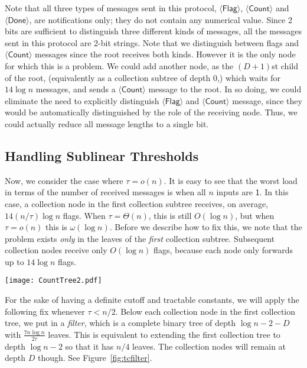 \documentclass[11pt,letter]{article}
\theoremstyle{mytheoremstyle}
\let\savedCaption=\caption
\renewcommand*{\caption}[1]{\savedCaption[#1]{~#1}}
\newcommand{\dcl}{D}
\newcommand{\flag}{$\langle\mathsf{Flag}\rangle$\xspace}
\newcommand{\countm}{$\langle\mathsf{Count}\rangle$\xspace}
\newcommand{\done}{$\langle\mathsf{Done}\rangle$\xspace}
\newcommand{\ct}{count tree\xspace}
\begin{document}
Note that all three types of messages sent in this protocol, \flag, \countm and \done, are notifications only; they do not contain any numerical value.
Since 2 bits are sufficient to distinguish three different kinds of messages, all the messages sent in this protocol are 2-bit strings. Note that we distinguish between flags and \countm messages since the root receives both kinds. However it is the only node for which this is a problem. We could add another node, as the $(D+1)$st child of the root, (equivalently as a collection subtree of depth 0,) which waits for $14\log{n}$ messages, and sends a \countm message to the root. In so doing, we could eliminate the need to explicitly distinguish \flag and \countm message, since they would be automatically distinguished by the role of the receiving node. Thus, we could actually reduce all message lengths to a single bit.

\subsection{Handling Sublinear Thresholds}
Now, we consider the case where $\tau = o(n)$. It is easy to see that the worst load in terms of the number of received messages is when all $n$ inputs are $\mathsf{1}$.
In this case, a collection node in the first collection subtree receives, on average, $14( n/\tau)\log{n}$ flags. When $\tau = \Theta(n)$, this is still $O(\log{n})$, but when $\tau=o(n)$ this is $\omega(\log{n})$. Before we describe how to fix this, we note that the problem exists \emph{only} in the leaves of the \emph{first} collection subtree. Subsequent collection nodes receive only $O(\log{n})$ flags, because each node only forwards up to $14\log{n}$ flags.

\begin{figure*}[t]
	\begin{center}
		\texttt{[image: CountTree2.pdf]}
	\end{center}
	\caption{The \ct for $n=2048$ and $\tau=616$.
		$\dcl = \lceil \log{\frac{616}{14 \times 11}}\rceil = 2$.
		The node marked $R$ is the root, nodes marked $A$ are adding
		nodes and nodes marked $C$ are collection nodes. The filters,
		marked $F$, are complete binary trees of depth 7, with 128 leaves each, for a total of 512 filter leaves.
		}\label{fig:tcfilter}
\end{figure*}

For the sake of having a definite cutoff and tractable constants, we will apply the following fix whenever $\tau < n/2$. Below each collection node in the first collection tree, we put in a \emph{filter}, which is a complete binary tree of depth $\log{n} -2 -D$ with $\frac{7n\log{n}}{2\tau}$ leaves. This is equivalent to extending the first collection tree to depth $\log{n}-2$ so that it has $n/4$ leaves. The collection nodes will remain at depth $D$ though. See Figure~\ref{fig:tcfilter}.
\end{document}
